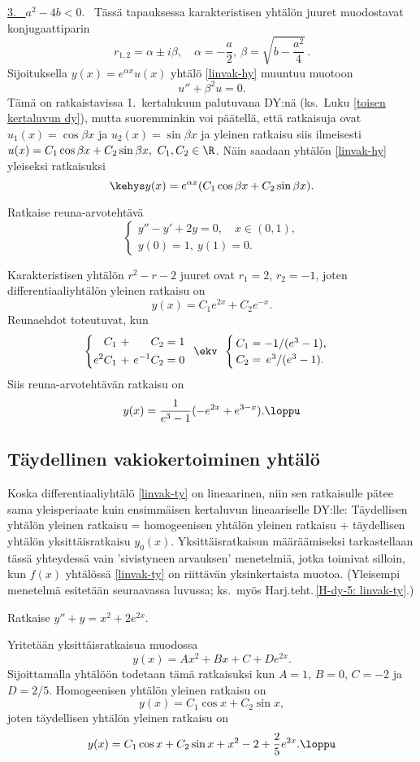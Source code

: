 \underline{3. \ $a^2-4b<0$}. \ Tässä tapauksessa karakteristisen yhtälön juuret muodostavat
konjugaattiparin
\[
r_{1,2}=\alpha\pm i\beta,\quad \alpha=-\frac{a}{2}, \ \beta=\sqrt{b-\frac{a^2}{4}}\,.
\]
Sijoituksella $y(x)=e^{\alpha x}u(x)$ yhtälö \eqref{linvak-hy} muuntuu muotoon
\[
u''+\beta^2 u = 0.
\]
Tämä on ratkaistavissa 1.\ kertalukuun palutuvana DY:nä (ks.\ Luku \ref{toisen kertaluvun dy}),
mutta suoremminkin voi päätellä, että ratkaisuja ovat
$u_1(x)=\cos\beta x$ ja $u_2(x)=\sin\beta x$ ja yleinen ratkaisu siis ilmeisesti
$u(x)=C_1\cos\beta x+C_2\sin\beta x,\ C_1,C_2\in\R$. Näin saadaan yhtälön \eqref{linvak-hy}
yleiseksi ratkaisuksi
\[
\kehys y(x)=e^{\alpha x}(C_1\cos\beta x + C_2\sin\beta x).
\]
\begin{Exa}
Ratkaise reuna-arvotehtävä
\[
\begin{cases}
y''-y'+2y=0,\quad x\in (0,1), \\
y(0)=1, \ y(1)=0.
\end{cases}
\]
\end{Exa}
\ratk Karakteristisen yhtälön $r^2-r-2$ juuret ovat $r_1=2$, $r_2=-1$, joten 
differentiaaliyhtälön yleinen ratkaisu on
\[
y(x)=C_1e^{2x}+C_2e^{-x}.
\]
Reunaehdot toteutuvat, kun
\[
\left\{ \begin{alignedat}{3}
&C_1 \ + \ & &C_2 & &=1 \\
e^2&C_1 \ + \ & e^{-1}&C_2 & &=0
\end{alignedat} \right. \,\ \ekv \,\ 
\begin{cases}
\,C_1=-1/(e^3-1), \\
\,C_2=\,e^3/(e^3-1).
\end{cases}
\]
Siis reuna-arvotehtävän ratkaisu on
\[
y(x)=\frac{1}{e^3-1}(-e^{2x}+e^{3-x}). \loppu
\] 

\subsection*{Täydellinen vakiokertoiminen yhtälö}

Koska differentiaaliyhtälö \eqref{linvak-ty} on lineaarinen, niin sen ratkaisulle pätee sama
yleisperiaate kuin ensimmäisen kertaluvun lineaariselle DY:lle: Täydellisen yhtälön yleinen
ratkaisu = homogeenisen yhtälön yleinen ratkaisu + täydellisen yhtälön yksittäisratkaisu
$y_0(x)$. Yksittäisratkaisun määräämiseksi tarkastellaan tässä yhteydessä vain 'sivistyneen
arvauksen' menetelmiä, jotka toimivat silloin, kun $f(x)$ yhtälössä \eqref{linvak-ty} on
riittävän yksinkertaista muotoa. (Yleisempi menetelmä esitetään seuraavassa luvussa; ks.\ myös
Harj.teht.\,\ref{H-dy-5: linvak-ty}.)
\begin{Exa}
Ratkaise $y''+y=x^2+2e^{2x}$.
\end{Exa}
\ratk Yritetään yksittäisratkaisua muodossa
\[
y(x)=Ax^2+Bx+C+De^{2x}.
\]
Sijoittamalla yhtälöön todetaan tämä ratkaisuksi kun $A=1$, $B=0$, $C=-2$ ja $D=2/5$.
Homogeenisen yhtälön yleinen ratkaisu on
\[
y(x)=C_1\cos x+C_2\sin x,
\]
joten täydellisen yhtälön yleinen ratkaisu on
\[
y(x)=C_1\cos x+C_2\sin x+x^2-2+\frac{2}{5}e^{2x}. \loppu
\]

